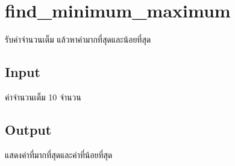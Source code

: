 \documentclass{article}
\begin{document}
\section*{find_minimum_maximum}

รับค่าจำนวนเต็ม แล้วหาค่ามากที่สุดและน้อยที่สุด\\



\subsection*{Input}
ค่าจำนวนเต็ม 10 จำนวน



\subsection*{Output}
แสดงค่าที่มากที่สุดและค่าที่น้อยที่สุด
\end{document}
